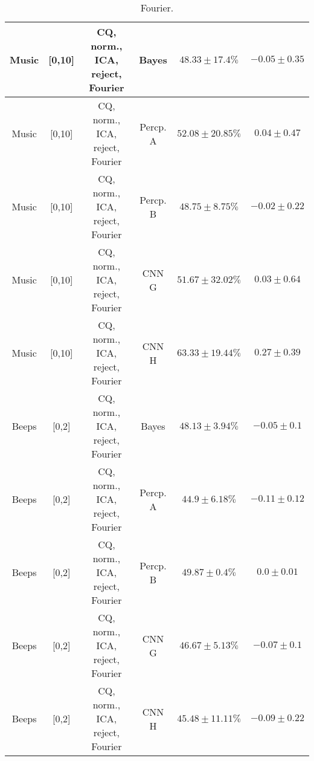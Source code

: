 \begin{table}[!htb]
{\begin{tabular}{c|c|c|c|c|c}
    \hline
    Music               & [0,10]                                        & CQ, norm., ICA, reject, Fourier& Bayes                 &  $48.33 \pm 17.4\%$   & $-0.05 \pm 0.35$\\ 
    \hline
    Music               & [0,10]                                        & CQ, norm., ICA, reject, Fourier& Percp. A              &  $52.08 \pm 20.85\%$  & $0.04 \pm 0.47$\\   
    \hline
    Music               & [0,10]                                        & CQ, norm., ICA, reject, Fourier& Percp. B              &  $48.75 \pm 8.75\%$   & $-0.02 \pm 0.22$\\   
    \hline
    Music               & [0,10]                                        & CQ, norm., ICA, reject, Fourier& CNN G                 &  $51.67 \pm 32.02\%$  & $0.03 \pm 0.64$\\   
    \hline
    Music               & [0,10]                                        & CQ, norm., ICA, reject, Fourier& CNN H                 &  $63.33 \pm 19.44\%$  & $0.27 \pm 0.39$\\   
    \hline \hline
    Beeps               & [0,2]                                         & CQ, norm., ICA, reject, Fourier& Bayes                 &  $48.13 \pm 3.94\%$   & $-0.05 \pm 0.1$\\  
    \hline
    Beeps               & [0,2]                                         & CQ, norm., ICA, reject, Fourier& Percp. A              &  $44.9 \pm 6.18\%$   & $-0.11 \pm 0.12$\\  
    \hline
    Beeps               & [0,2]                                         & CQ, norm., ICA, reject, Fourier& Percp. B              &  $49.87 \pm 0.4\%$   & $0.0 \pm 0.01$\\   
    \hline
    Beeps               & [0,2]                                         & CQ, norm., ICA, reject, Fourier& CNN G                 &  $46.67 \pm 5.13\%$  & $-0.07 \pm 0.1$\\   
    \hline
    Beeps               & [0,2]                                         & CQ, norm., ICA, reject, Fourier& CNN H                 &  $45.48 \pm 11.11\%$  & $-0.09 \pm 0.22$\\   
    \hline
\end{tabular}
}
\caption{Fourier.}
\label{tab:sound-fourier+reject-app}
\end{table}